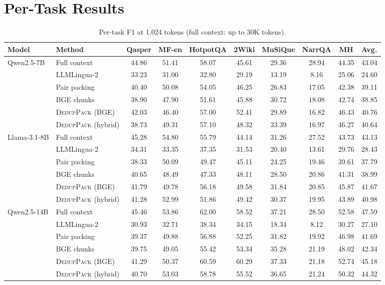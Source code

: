 \documentclass[11pt]{article}
\newcommand{\spk}{\textsc{DedupPack}}
\begin{document}
\section{Per-Task Results}
\label{app:pertask}

\begin{table}[t]
\centering
\small
\setlength{\tabcolsep}{4pt}
\begin{tabular}{llcccccc|cc}
\toprule
Model & Method & Qasper & MF-en & HotpotQA & 2Wiki & MuSiQue & NarrQA & MH & Avg. \\
\midrule
\multirow{6}{*}{Qwen2.5-7B}
 & Full context & 44.86 & 51.41 & 58.07 & 45.61 & 29.36 & 28.94 & 44.35 & 43.04 \\
 & LLMLingua-2 & 33.23 & 31.00 & 32.80 & 29.19 & 13.19 & 8.16 & 25.06 & 24.60 \\
 & Pair packing & 40.40 & 50.08 & 54.05 & 46.25 & 26.83 & 17.05 & 42.38 & 39.11 \\
 & BGE chunks & 38.90 & 47.90 & 51.61 & 45.88 & 30.72 & 18.08 & 42.74 & 38.85 \\
 & \spk{} (BGE) & 42.03 & 46.40 & 57.00 & 52.41 & 29.89 & 16.82 & 46.43 & 40.76 \\
 & \spk{} (hybrid) & 38.73 & 49.31 & 57.10 & 48.32 & 33.39 & 16.97 & 46.27 & 40.64 \\
\midrule
\multirow{6}{*}{Llama-3.1-8B}
 & Full context & 45.28 & 54.80 & 55.79 & 44.14 & 31.26 & 27.52 & 43.73 & 43.13 \\
 & LLMLingua-2 & 34.31 & 33.35 & 37.35 & 31.53 & 20.40 & 13.61 & 29.76 & 28.43 \\
 & Pair packing & 38.33 & 50.09 & 49.47 & 45.11 & 24.25 & 19.46 & 39.61 & 37.79 \\
 & BGE chunks & 40.65 & 48.49 & 47.33 & 48.11 & 28.50 & 20.86 & 41.31 & 38.99 \\
 & \spk{} (BGE) & 41.79 & 49.78 & 56.18 & 49.58 & 31.84 & 20.85 & 45.87 & 41.67 \\
 & \spk{} (hybrid) & 41.28 & 52.99 & 51.86 & 49.42 & 30.37 & 19.95 & 43.89 & 40.98 \\
\midrule
\multirow{6}{*}{Qwen2.5-14B}
 & Full context & 45.46 & 53.86 & 62.00 & 58.52 & 37.21 & 28.50 & 52.58 & 47.59 \\
 & LLMLingua-2 & 30.93 & 32.71 & 38.34 & 34.15 & 18.34 & 8.12 & 30.27 & 27.10 \\
 & Pair packing & 39.37 & 49.88 & 56.88 & 52.25 & 31.82 & 19.92 & 46.98 & 41.69 \\
 & BGE chunks & 39.75 & 49.05 & 55.42 & 53.34 & 35.28 & 21.19 & 48.02 & 42.34 \\
 & \spk{} (BGE) & 41.29 & 50.37 & 60.59 & 60.29 & 37.33 & 21.18 & 52.74 & 45.18 \\
 & \spk{} (hybrid) & 40.70 & 53.03 & 58.78 & 55.52 & 36.65 & 21.24 & 50.32 & 44.32 \\
\bottomrule
\end{tabular}
\caption{Per-task F1 at 1,024 tokens (full context: up to 30K tokens).}
\label{tab:pertask}
\end{table}
\end{document}
